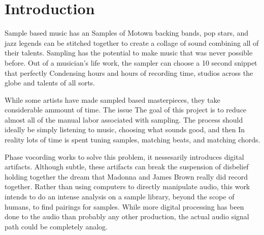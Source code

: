 \section{Introduction}

Sample based music has an 
Samples of Motown backing bands, pop stars, and jazz legends can be stitched together to create a collage of sound combining all of their talents.
Sampling has the potential to make music that was never possible before.
Out of a musician's life work, the sampler can choose a 10 second snippet that perfectly
Condensing hours and hours of recording time, studios across the globe and talents of all sorts.

While some artists have made sampled based masterpieces, they take considerable ammount of time.
The issue
The goal of this project is to reduce almost all of the manual labor associated with sampling.
The process should ideally be simply listening to music, choosing what sounds good, and then
In reality lots of time is spent tuning samples, matching beats, and matching chords.

Phase vocording works to solve this problem, it nessesarily introduces digital artifacts.
Although subtle, these artifacts can break the suspension of disbelief holding together the dream that Madonna and James Brown really did record together.
Rather than using computers to directly manipulate audio, this work intends to do an intense analysis on a sample library, beyond the scope of humans, to find pairings for samples.
While more digital processing has been done to the audio than probably any other production, the actual audio signal path could be completely analog. 
